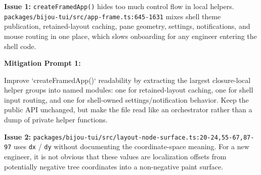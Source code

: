 \textbf{Issue 1:} \texttt{c\allowbreak{}r\allowbreak{}e\allowbreak{}a\allowbreak{}t\allowbreak{}e\allowbreak{}F\allowbreak{}r\allowbreak{}a\allowbreak{}m\allowbreak{}e\allowbreak{}d\allowbreak{}A\allowbreak{}p\allowbreak{}p\allowbreak{}(\allowbreak{})} hides too much control flow in local helpers. \texttt{p\allowbreak{}a\allowbreak{}c\allowbreak{}k\allowbreak{}a\allowbreak{}g\allowbreak{}e\allowbreak{}s\allowbreak{}/\allowbreak{}b\allowbreak{}i\allowbreak{}j\allowbreak{}o\allowbreak{}u\allowbreak{}-\allowbreak{}t\allowbreak{}u\allowbreak{}i\allowbreak{}/\allowbreak{}s\allowbreak{}r\allowbreak{}c\allowbreak{}/\allowbreak{}a\allowbreak{}p\allowbreak{}p\allowbreak{}-\allowbreak{}f\allowbreak{}r\allowbreak{}a\allowbreak{}m\allowbreak{}e\allowbreak{}.\allowbreak{}t\allowbreak{}s\allowbreak{}:\allowbreak{}6\allowbreak{}4\allowbreak{}5\allowbreak{}-\allowbreak{}1\allowbreak{}6\allowbreak{}3\allowbreak{}1} mixes shell theme publication, retained-layout caching, pane geometry, settings, notifications, and mouse routing in one place, which slows onboarding for any engineer entering the shell code.

\textbf{Mitigation Prompt 1:}

\begin{CodeBlock}
Improve `createFramedApp()` readability by extracting the largest closure-local helper groups into named modules: one for retained-layout caching, one for shell input routing, and one for shell-owned settings/notification behavior. Keep the public API unchanged, but make the file read like an orchestrator rather than a dump of private helper functions.
\end{CodeBlock}

\textbf{Issue 2:} \texttt{p\allowbreak{}a\allowbreak{}c\allowbreak{}k\allowbreak{}a\allowbreak{}g\allowbreak{}e\allowbreak{}s\allowbreak{}/\allowbreak{}b\allowbreak{}i\allowbreak{}j\allowbreak{}o\allowbreak{}u\allowbreak{}-\allowbreak{}t\allowbreak{}u\allowbreak{}i\allowbreak{}/\allowbreak{}s\allowbreak{}r\allowbreak{}c\allowbreak{}/\allowbreak{}l\allowbreak{}a\allowbreak{}y\allowbreak{}o\allowbreak{}u\allowbreak{}t\allowbreak{}-\allowbreak{}n\allowbreak{}o\allowbreak{}d\allowbreak{}e\allowbreak{}-\allowbreak{}s\allowbreak{}u\allowbreak{}r\allowbreak{}f\allowbreak{}a\allowbreak{}c\allowbreak{}e\allowbreak{}.\allowbreak{}t\allowbreak{}s\allowbreak{}:\allowbreak{}2\allowbreak{}0\allowbreak{}-\allowbreak{}2\allowbreak{}4\allowbreak{},\allowbreak{}5\allowbreak{}5\allowbreak{}-\allowbreak{}6\allowbreak{}7\allowbreak{},\allowbreak{}8\allowbreak{}7\allowbreak{}-\allowbreak{}9\allowbreak{}7} uses \texttt{d\allowbreak{}x} / \texttt{d\allowbreak{}y} without documenting the coordinate-space meaning. For a new engineer, it is not obvious that these values are localization offsets from potentially negative tree coordinates into a non-negative paint surface.

